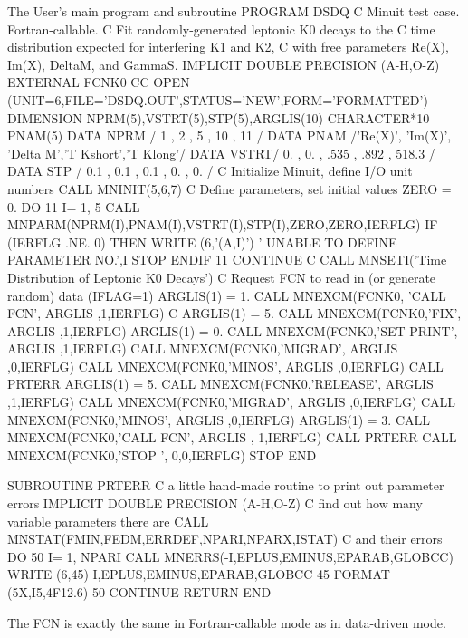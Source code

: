 \begin{XMPt}{The User's main program and subroutine}
      PROGRAM DSDQ
C             Minuit test case.  Fortran-callable.
C             Fit randomly-generated leptonic K0 decays to the
C       time distribution expected for interfering K1 and K2,
C       with free parameters Re(X), Im(X), DeltaM, and GammaS.
      IMPLICIT DOUBLE PRECISION (A-H,O-Z)
      EXTERNAL FCNK0
CC    OPEN (UNIT=6,FILE='DSDQ.OUT',STATUS='NEW',FORM='FORMATTED')
      DIMENSION NPRM(5),VSTRT(5),STP(5),ARGLIS(10)
      CHARACTER*10 PNAM(5)
      DATA NPRM /   1   ,    2   ,     5    ,   10     ,  11    /
      DATA PNAM /'Re(X)', 'Im(X)', 'Delta M','T Kshort','T Klong'/
      DATA VSTRT/   0.  ,    0.  ,    .535  ,   .892   ,  518.3 /
      DATA STP  /   0.1 ,    0.1 ,     0.1  ,     0.   ,   0.   /
C        Initialize Minuit, define I/O unit numbers
      CALL MNINIT(5,6,7)
C        Define parameters, set initial values
      ZERO = 0.
      DO 11  I= 1, 5
       CALL MNPARM(NPRM(I),PNAM(I),VSTRT(I),STP(I),ZERO,ZERO,IERFLG)
       IF (IERFLG .NE. 0)  THEN
          WRITE (6,'(A,I)')  ' UNABLE TO DEFINE PARAMETER NO.',I
          STOP
       ENDIF
   11 CONTINUE
C
      CALL MNSETI('Time Distribution of Leptonic K0 Decays')
C       Request FCN to read in (or generate random) data (IFLAG=1)
           ARGLIS(1) = 1.
      CALL MNEXCM(FCNK0, 'CALL FCN', ARGLIS ,1,IERFLG)
C
         ARGLIS(1) = 5.
      CALL MNEXCM(FCNK0,'FIX', ARGLIS ,1,IERFLG)
         ARGLIS(1) = 0.
      CALL MNEXCM(FCNK0,'SET PRINT', ARGLIS ,1,IERFLG)
      CALL MNEXCM(FCNK0,'MIGRAD', ARGLIS ,0,IERFLG)
      CALL MNEXCM(FCNK0,'MINOS', ARGLIS ,0,IERFLG)
         CALL PRTERR
         ARGLIS(1) = 5.
      CALL MNEXCM(FCNK0,'RELEASE', ARGLIS ,1,IERFLG)
      CALL MNEXCM(FCNK0,'MIGRAD', ARGLIS ,0,IERFLG)
      CALL MNEXCM(FCNK0,'MINOS', ARGLIS ,0,IERFLG)
         ARGLIS(1) = 3.
      CALL MNEXCM(FCNK0,'CALL FCN', ARGLIS , 1,IERFLG)
         CALL PRTERR
      CALL MNEXCM(FCNK0,'STOP ', 0,0,IERFLG)
      STOP
      END
 
      SUBROUTINE PRTERR
C   a little hand-made routine to print out parameter errors
      IMPLICIT DOUBLE PRECISION (A-H,O-Z)
C  find out how many variable parameters there are
      CALL MNSTAT(FMIN,FEDM,ERRDEF,NPARI,NPARX,ISTAT)
C   and their errors
      DO 50 I= 1, NPARI
      CALL MNERRS(-I,EPLUS,EMINUS,EPARAB,GLOBCC)
      WRITE (6,45) I,EPLUS,EMINUS,EPARAB,GLOBCC
   45 FORMAT (5X,I5,4F12.6)
   50 CONTINUE
      RETURN
      END
\end{XMPt}

The FCN is exactly the same in Fortran-callable mode as in
data-driven mode.
